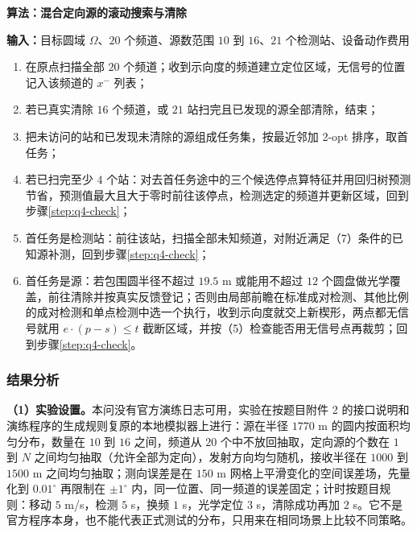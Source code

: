 \par\medskip
\noindent\begin{minipage}{\linewidth}
\small
{}\label{alg:q4-search}
\textbf{算法\thealgorithm：混合定向源的滚动搜索与清除}\par\smallskip
\noindent\textbf{输入：}目标圆域 $\Omega$、$20$ 个频道、源数范围 $10$ 到 $16$、$21$ 个检测站、设备动作费用
\begin{enumerate}
\setlength{\itemsep}{2pt}
\setlength{\parskip}{0pt}
\item 在原点扫描全部 $20$ 个频道；收到示向度的频道建立定位区域，无信号的位置记入该频道的 $x^-$ 列表；
\item\label{step:q4-check} 若已真实清除 $16$ 个频道，或 $21$ 站扫完且已发现的源全部清除，结束；
\item 把未访问的站和已发现未清除的源组成任务集，按最近邻加 2-opt 排序，取首任务；
\item 若已扫完至少 $4$ 个站：对去首任务途中的三个候选停点算特征并用回归树预测节省，预测值最大且大于零时前往该停点，检测选定的频道并更新区域，回到步骤\ref{step:q4-check}；
\item 首任务是检测站：前往该站，扫描全部未知频道，对附近满足（7）条件的已知源补测，回到步骤\ref{step:q4-check}；
\item 首任务是源：若包围圆半径不超过 $19.5$ m 或能用不超过 $12$ 个圆盘做光学覆盖，前往清除并按真实反馈登记；否则由局部前瞻在标准成对检测、其他比例的成对检测和单点检测中选一个执行，收到示向度就交上新楔形，两点都无信号就用 $e\cdot(p-s)\le t$ 截断区域，并按（5）检查能否用无信号点再裁剪；回到步骤\ref{step:q4-check}。
\end{enumerate}
\end{minipage}
\par\medskip

\subsubsection{结果分析}\label{sec:q4-4}

\textbf{（1）实验设置。}本问没有官方演练日志可用，实验在按题目附件 2 的接口说明和演练程序的生成规则复原的本地模拟器上进行：源在半径 $1770$ m 的圆内按面积均匀分布，数量在 $10$ 到 $16$ 之间，频道从 $20$ 个中不放回抽取，定向源的个数在 $1$ 到 $N$ 之间均匀抽取（允许全部为定向），发射方向均匀随机，接收半径在 $1000$ 到 $1500$ m 之间均匀抽取；测向误差是在 $150$ m 网格上平滑变化的空间误差场，先量化到 $0.01^\circ$ 再限制在 $\pm1^\circ$ 内，同一位置、同一频道的误差固定；计时按题目规则：移动 $5$ m/s，检测 $5$ s，换频 $1$ s，光学定位 $3$ s，清除成功再加 $2$ s。它不是官方程序本身，也不能代表正式测试的分布，只用来在相同场景上比较不同策略。

